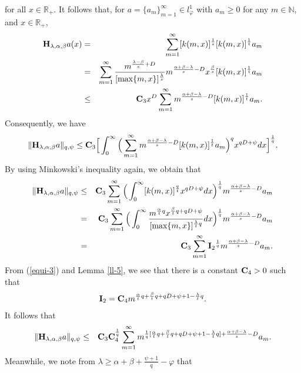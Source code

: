 \documentclass[10pt]{amsart}
\theoremstyle{definition}    %
\numberwithin{equation}{section}
\begin{document}
for all $x\in \mathbb{R}_{+}$. It follows that, for $a=\{a_m\}_{m=1}^{\infty}\in l_{\varphi}^{1}$ with $a_m\geq 0$ for any $m\in \mathbb{N}$, and $x\in \mathbb{R}_{+}$,
\begin{eqnarray}
{\bf H}_{\lambda, \alpha, \beta}a(x)&=&\sum_{m=1}^{\infty}[k(m,x)]^\frac{1}{s}[k(m,x)]^{\frac{1}{t}}a_m \nonumber \\
&=&\sum_{m=1}^{\infty}\frac{m^{\frac{\lambda-\beta}{s}+D}}{[\max\{m,x\}]^{\frac{\lambda}{s}}}m^{\frac{\alpha+\beta-\lambda}{s}-D}x^{\frac{\beta}{s}}[k(m,x)]^{\frac{1}{t}}a_m \nonumber \\
&\leq & {\bf C}_3 x^{D}\sum_{m=1}^{\infty}m^{\frac{\alpha+\beta-\lambda}{s}-D}[k(m,x)]^{\frac{1}{t}}a_m. \nonumber 
\end{eqnarray}
Consequently, we have
\begin{equation}
\|{\bf H}_{\lambda, \alpha, \beta}a\|_{q, \psi}\leq {\bf C}_3\Big[\int_{0}^{\infty}\Big(\sum_{m=1}^{\infty}m^{\frac{\alpha+\beta-\lambda}{s}-D}[k(m,x)]^{\frac{1}{t}}a_m\Big)^q x^{qD+\psi}dx\Big]^{\frac{1}{q}}. \nonumber
\end{equation}
By using Minkowski's inequality again, we obtain that 
\begin{eqnarray}
\|{\bf H}_{\lambda, \alpha, \beta}a\|_{q, \psi}&\leq& {\bf C}_3\sum_{m=1}^{\infty}\Big(\int_{0}^{\infty}[k(m,x)]^{\frac{q}{t}}x^{qD+\psi}dx\Big)^\frac{1}{q}m^{\frac{\alpha+\beta-\lambda}{s}-D}a_m \nonumber \\
&=& {\bf C}_3\sum_{m=1}^{\infty}\Big(\int_{0}^{\infty}\frac{m^{\frac{\alpha}{t}q}x^{\frac{\beta}{t}q+qD+\psi}}{[\max\{m,x\}]^{\frac{\lambda}{t}q}}dx\Big)^\frac{1}{q}m^{\frac{\alpha+\beta-\lambda}{s}-D}a_m\nonumber \\
&=&  {\bf C}_3\sum_{m=1}^{\infty}{{\bf I}_2}^\frac{1}{q}m^{\frac{\alpha+\beta-\lambda}{s}-D}a_m. \nonumber
\end{eqnarray}
From (\ref{equi-3}) and Lemma \ref{ll-5}, we see that there is a constant ${\bf C}_4>0$ such that 
\begin{eqnarray}
{{\bf I}_2}={\bf C}_4 m^{\frac{\alpha}{t}q+\frac{\beta}{t}q+qD+\psi+1-\frac{\lambda}{t}q}. \nonumber 
\end{eqnarray}
It follows that
\begin{eqnarray}
\|{\bf H}_{\lambda, \alpha, \beta}a\|_{q, \psi}&\leq& {\bf C}_3{\bf C}_4^{\frac{1}{q}}\sum_{m=1}^{\infty}m^{\frac{1}{q}[\frac{\alpha}{t}q+\frac{\beta}{t}q+qD+\psi+1-\frac{\lambda}{t}q]+\frac{\alpha+\beta-\lambda}{s}-D}a_m. \nonumber
\end{eqnarray}
Meanwhile, we note from $\lambda \geq \alpha+\beta+\frac{\psi+1}{q}-\varphi$ that
\end{document}

